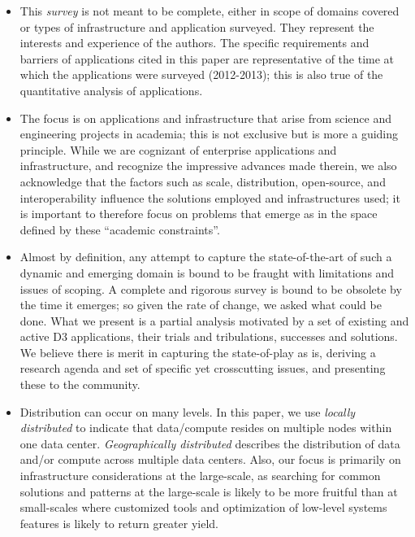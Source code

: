 \begin{itemize}

\item This {\it survey} is not meant to be complete, either in scope of domains
  covered or types of infrastructure and application surveyed.  They
  represent the interests and experience of the authors. The specific
  requirements and barriers of applications cited in this paper are
  representative of the time at which the applications were surveyed
  (2012-2013); this is also true of the quantitative analysis of applications.
  

\item The focus is on applications and infrastructure that arise from science
  and engineering projects in academia; this is not exclusive but is more a
  guiding principle.  While we are cognizant of enterprise applications and
  infrastructure, and recognize the impressive advances made therein, we also
  acknowledge that the factors such as scale, distribution, open-source, and
  interoperability influence the solutions employed and infrastructures used; it
  is important to therefore focus on problems that emerge as in the space
  defined by these ``academic constraints''.

\item Almost by definition, any attempt to capture the state-of-the-art of such
  a dynamic and emerging domain is bound to be fraught with limitations and
  issues of scoping.  A complete and rigorous survey is bound to be obsolete by
  the time it emerges; so given the rate of change, we asked what could be
  done. What we present is a partial analysis motivated by a set of existing and
  active D3 applications, their trials and tribulations, successes and
  solutions. We believe there is merit in capturing the state-of-play as is,
  deriving a research agenda and set of specific yet crosscutting issues, and
  presenting these to the community.

\item Distribution can occur on many levels.  In this paper, we use {\em locally
    distributed} to indicate that data/compute resides on multiple nodes within
  one data center.  {\em Geographically distributed} describes the distribution
  of data and/or compute across multiple data centers.  Also, our focus is
  primarily on infrastructure considerations at the large-scale, as searching
  for common solutions and patterns at the large-scale is likely to be more
  fruitful than at small-scales where customized tools and optimization of
  low-level systems features is likely to return greater yield.


\end{itemize}


